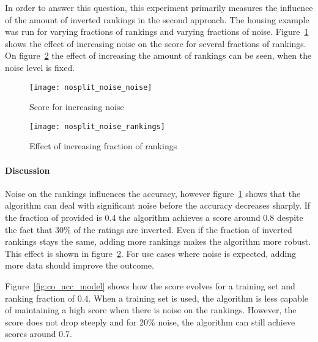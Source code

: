 \begin{experiment}
	In order to answer this question, this experiment primarily measures the influence of the amount of inverted rankings in the second approach.
	The housing example was run for varying fractions of rankings and varying fractions of noise.
	Figure~\ref{fig:nosplit_noise_noise} shows the effect of increasing noise on the score for several fractions of rankings.
	On figure~\ref{fig:nosplit_noise_rankings} the effect of increasing the amount of rankings can be seen, when the noise level is fixed.

	\begin{figure}

		\caption{Score for increasing noise}
		\centering
			\texttt{[image: nosplit\_noise\_noise]}
		\label{fig:nosplit_noise_noise}

	\end{figure}

	\begin{figure}

		\caption{Effect of increasing fraction of rankings}
		\centering
			\texttt{[image: nosplit\_noise\_rankings]}
		\label{fig:nosplit_noise_rankings}

	\end{figure}

\end{experiment}

\paragraph{Discussion}
Noise on the rankings influences the accuracy, however figure~\ref{fig:nosplit_noise_noise} shows that the algorithm can deal with significant noise before the accuracy decreases sharply.
If the fraction of provided is 0.4 the algorithm achieves a score around 0.8 despite the fact that 30\% of the ratings are inverted. 
Even if the fraction of inverted rankings stays the same, adding more rankings makes the algorithm more robust.
This effect is shown in figure~\ref{fig:nosplit_noise_rankings}.
For use cases where noise is expected, adding more data should improve the outcome.

Figure~\ref{fig:co_acc_model} shows how the score evolves for a training set and ranking fraction of 0.4.  
When a training set is used, the algorithm is less capable of maintaining a high score when there is noise on the rankings.
However, the score does not drop steeply and for 20\% noise, the algorithm can still achieve scores around 0.7.


